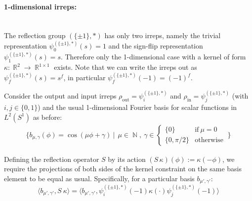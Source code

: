 \documentclass{article}
\newcommand{\lp}{\left(}
\newcommand{\rp}{\right)}
\DeclareMathOperator*{\R}{\mathbb{R}}
\DeclareMathOperator*{\N}{\mathbb{N}}
\newcommand{\Flip}{(\{\pm 1\}, *)}
\begin{document}
~\\[-4.ex]
\paragraph{1-dimensional irreps:}~\\[.75ex] 

The reflection group $\Flip$ has only two irreps, namely the trivial representation $\psi_0^{\Flip}(s)=1$ and the sign-flip representation $\psi_1^{\Flip}(s)=s$.
Therefore only the 1-dimensional case with a kernel of form $\kappa:\R^2\to\R^{1\times1}$ exists.
Note that we can write the irreps out as $\psi_{f}^{\Flip}(s)=s^f$, in particular $\psi_{f}^{\Flip}(-1)=(-1)^f$.

Consider the output and input irreps $\rho_\text{out}=\psi_{i}^{\Flip}$ and $\rho_\text{in}=\psi_{j}^{\Flip}$ (with $i, j \in \{0, 1\}$) and the usual 1-dimensional Fourier basis for scalar functions in $L^2(S^1)$ as before:
\begin{align}
\label{eq:flip_1x1_starting_basis}
\Bigg\{ b_{\mu,\gamma}(\phi) = \cos(\mu\phi +\gamma) \ \Bigg|\ \ \mu \in \N,\ \gamma \in 
        \begin{cases}
            \{0\}        &\!\!\text{if}\ \mu=0 \\[-1pt]
            \{0, \pi/2\} &\!\!\text{otherwise}
        \end{cases}
        \ 
    \Bigg\}
\end{align}

Defining the reflection operator $S$ by its action $\lp S\,\kappa\rp (\phi) := \kappa(-\phi)$, we require the projections of both sides of the kernel constraint on the same basis element to be equal as usual.
Specifically, for a particular basis $b_{\mu',\gamma'}$:
\[
    \langle b_{\mu',\gamma'}, S\ \kappa \rangle = \langle b_{\mu',\gamma'}, \psi_{i}^{\Flip}(-1)\kappa(\cdot)\psi_{j}^{\Flip}(-1)\rangle
\]
\end{document}
